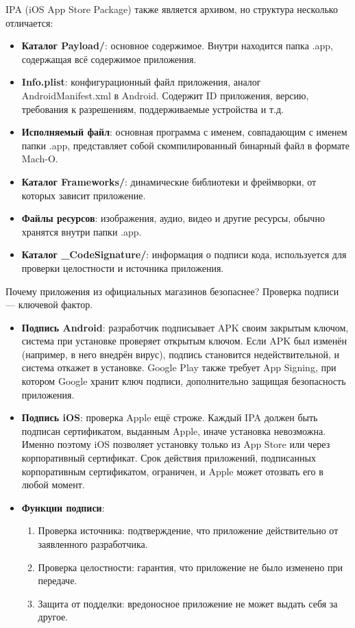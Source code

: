 IPA (iOS App Store Package) также является архивом, но структура несколько отличается:

\begin{itemize}
  \item \textbf{Каталог Payload/}: основное содержимое. Внутри находится папка .app, содержащая всё содержимое приложения.
  \item \textbf{Info.plist}: конфигурационный файл приложения, аналог AndroidManifest.xml в Android. Содержит ID приложения, версию, требования к разрешениям, поддерживаемые устройства и т.д.
  \item \textbf{Исполняемый файл}: основная программа с именем, совпадающим с именем папки .app, представляет собой скомпилированный бинарный файл в формате Mach-O.
  \item \textbf{Каталог Frameworks/}: динамические библиотеки и фреймворки, от которых зависит приложение.
  \item \textbf{Файлы ресурсов}: изображения, аудио, видео и другие ресурсы, обычно хранятся внутри папки .app.
  \item \textbf{Каталог \_CodeSignature/}: информация о подписи кода, используется для проверки целостности и источника приложения.
\end{itemize}


Почему приложения из официальных магазинов безопаснее? Проверка подписи — ключевой фактор.

\begin{itemize}
  \item \textbf{Подпись Android}: разработчик подписывает APK своим закрытым ключом, система при установке проверяет открытым ключом. Если APK был изменён (например, в него внедрён вирус), подпись становится недействительной, и система откажет в установке. Google Play также требует App Signing, при котором Google хранит ключ подписи, дополнительно защищая безопасность приложения.
  \item \textbf{Подпись iOS}: проверка Apple ещё строже. Каждый IPA должен быть подписан сертификатом, выданным Apple, иначе установка невозможна. Именно поэтому iOS позволяет установку только из App Store или через корпоративный сертификат. Срок действия приложений, подписанных корпоративным сертификатом, ограничен, и Apple может отозвать его в любой момент.
  \item \textbf{Функции подписи}:
  \begin{enumerate}
    \item Проверка источника: подтверждение, что приложение действительно от заявленного разработчика.
    \item Проверка целостности: гарантия, что приложение не было изменено при передаче.
    \item Защита от подделки: вредоносное приложение не может выдать себя за другое.
  \end{enumerate}
\end{itemize}


